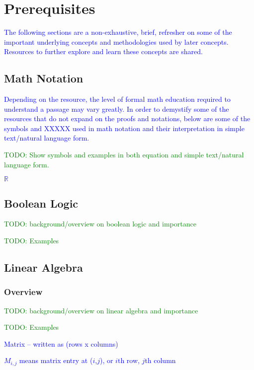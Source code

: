 \chapter{Prerequisites}

\textcolor{blue}{The following sections are a non-exhaustive, brief, refresher on some of the important underlying concepts and methodologies used by later concepts. Resources to further explore and learn these concepts are shared.}


\section{Math Notation}

\textcolor{blue}{Depending on the resource, the level of formal math education required to understand a passage may vary greatly. In order to demystify some of the resources that do not expand on the proofs and notations, below are some of the symbols and XXXXX used in math notation and their interpretation in simple text/natural language form.}

\textcolor{green}{TODO: Show symbols and examples in both equation and simple text/natural language form.}

\textcolor{blue}{$\mathbb{R}$}


\section{Boolean Logic}

\textcolor{green}{TODO: background/overview on boolean logic and importance}

\textcolor{green}{TODO: Examples}


\section{Linear Algebra}

\subsection{Overview}

\textcolor{green}{TODO: background/overview on linear algebra and importance}

\textcolor{green}{TODO: Examples}

\textcolor{blue}{Matrix -- written as (rows x columns)}

\textcolor{blue}{$M_{i,j}$ means matrix entry at ($i$,$j$), or $i$th row, $j$th column}

